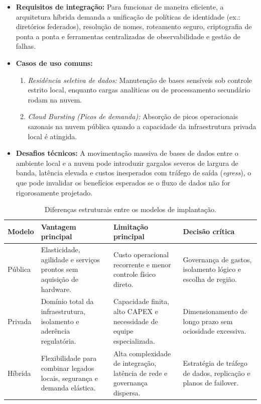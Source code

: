 \documentclass[11pt,a4paper]{article}
\begin{document}
\begin{itemize}[leftmargin=*]
    \item \textbf{Requisitos de integração:} Para funcionar de maneira eficiente, a arquitetura híbrida demanda a unificação de políticas de identidade (ex.: diretórios federados), resolução de nomes, roteamento seguro, criptografia de ponta a ponta e ferramentas centralizadas de observabilidade e gestão de falhas.
    \item \textbf{Casos de uso comuns:} 
        \begin{enumerate}
            \item \textit{Residência seletiva de dados:} Manutenção de bases sensíveis sob controle estrito local, enquanto cargas analíticas ou de processamento secundário rodam na nuvem.
            \item \textit{Cloud Bursting (Picos de demanda):} Absorção de picos operacionais sazonais na nuvem pública quando a capacidade da infraestrutura privada local é atingida.
        \end{enumerate}
    \item \textbf{Desafios técnicos:} A movimentação massiva de bases de dados entre o ambiente local e a nuvem pode introduzir gargalos severos de largura de banda, latência elevada e custos inesperados com tráfego de saída (\emph{egress}), o que pode invalidar os benefícios esperados se o fluxo de dados não for rigorosamente projetado.
\end{itemize}

\begin{table}[H]\centering\caption{Diferenças estruturais entre os modelos de implantação.}
\label{tab:modelos_implantacao}
\small\begin{tabularx}{\textwidth}{@{}p{2cm}Y Y Y@{}}\toprule
\textbf{Modelo} & \textbf{Vantagem principal} & \textbf{Limitação principal} & \textbf{Decisão crítica}\\\midrule
Pública & Elasticidade, agilidade e serviços prontos sem aquisição de hardware. & Custo operacional recorrente e menor controle físico direto. & Governança de gastos, isolamento lógico e escolha de região.\\
Privada & Domínio total da infraestrutura, isolamento e aderência regulatória. & Capacidade finita, alto CAPEX e necessidade de equipe especializada. & Dimensionamento de longo prazo sem ociosidade excessiva.\\
Híbrida & Flexibilidade para combinar legados locais, segurança e demanda elástica. & Alta complexidade de integração, latência de rede e governança dispersa. & Estratégia de tráfego de dados, replicação e planos de failover.\\\bottomrule
\end{tabularx}\end{table}
\end{document}
